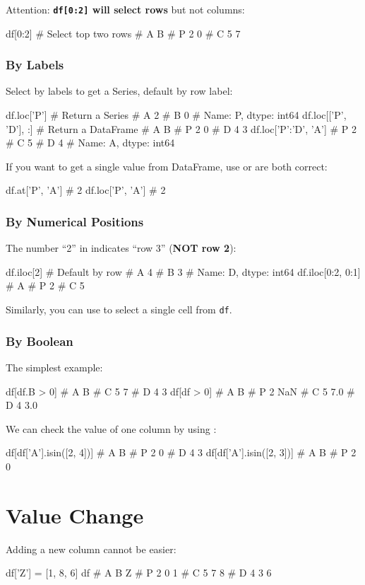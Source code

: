 \documentclass{report}
\newcommand{\Emph}[1]{\textcolor{cyan!80!white}{{\bfseries #1}}}
\begin{document}
Attention: \Emph{\texttt{df[0:2]} will select rows} but not columns:
\begin{py}
df[0:2] # Select top two rows
#    A  B
# P  2  0
# C  5  7
\end{py}

\subsubsection{By Labels}
Select by labels to get a Series, default by row label:
\begin{py}
df.loc['P']  # Return a Series
# A    2
# B    0
# Name: P, dtype: int64
df.loc[['P', 'D'], :]  # Return a DataFrame
#    A  B
# P  2  0
# D  4  3
df.loc['P':'D', 'A']
# P    2
# C    5
# D    4
# Name: A, dtype: int64
\end{py}

If you want to get a single value from DataFrame, use  or  are both correct:
\begin{py}
df.at['P', 'A']
# 2
df.loc['P', 'A']
# 2
\end{py}

\subsubsection{By Numerical Positions}
The number ``2'' in  indicates ``row 3'' (\Emph{NOT row 2}):
\begin{py}
df.iloc[2] # Default by row
# A    4
# B    3
# Name: D, dtype: int64
df.iloc[0:2, 0:1]
#    A
# P  2
# C  5
\end{py}

Similarly, you can use  to select a single cell from \texttt{df}. 

\subsubsection{By Boolean}
The simplest example:
\begin{py}
df[df.B > 0]
#    A  B
# C  5  7
# D  4  3
df[df > 0]
#    A    B
# P  2  NaN
# C  5  7.0
# D  4  3.0
\end{py}

We can check the value of one column by using :
\begin{py}
df[df['A'].isin([2, 4])]
#    A  B
# P  2  0
# D  4  3
df[df['A'].isin([2, 3])]
#    A  B
# P  2  0
\end{py}

\section{Value Change}
Adding a new column cannot be easier:
\begin{py}
df['Z'] = [1, 8, 6]
df
#    A  B  Z
# P  2  0  1
# C  5  7  8
# D  4  3  6
\end{py}
\end{document}
